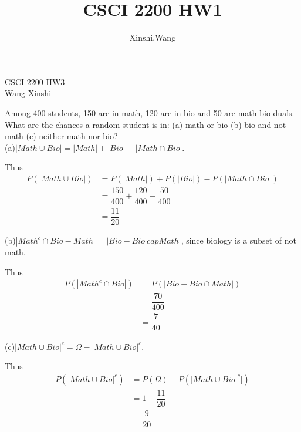 \documentclass{article}
\title{CSCI 2200 HW1}
\author{Xinshi,Wang}
\begin{document}
\noindent
CSCI 2200 HW3\\
Wang Xinshi\\

\begin{addmargin}[2em]{2em}
	 Among 400 students, 150 are in math, 120 are in bio and 50 are math-bio duals. What are the chances a random student is in: (a) math or bio (b) bio and not math (c) neither math nor bio?\\
	
	\noindent (a)$\left |Math \cup Bio \right| = \left |Math \right| + \left |Bio \right| - \left |Math \cap Bio \right|$.

	Thus
	\begin{align*}
		P(\left |Math \cup Bio \right|) &= P(\left |Math \right|) + P(\left |Bio \right|) - P(\left |Math \cap Bio \right|)\\
		&= \dfrac{150}{400}+\dfrac{120}{400}-\dfrac{50}{400}\\
		&= \dfrac{11}{20}
	\end{align*} 

	\noindent (b)$\left |Math^c \cap Bio-Math \right| = \left |Bio-Bio \ capMath \right|$, since biology is a subset of not math.
		
	Thus
	\begin{align*}
		P(\left |Math^c \cap Bio \right|) &= P(\left |Bio - Bio \cap Math \right|)\\
		&= \dfrac{70}{400}\\
		&= \dfrac{7}{40}
	\end{align*} 

	\noindent (c)$\left |Math \cup Bio \right|^c = \Omega - \left |Math \cup Bio \right|^c$.
	
	Thus
	\begin{align*}
		P(\left |Math \cup Bio \right|^c) &= P(\Omega) - P(\left |Math \cup Bio \right|^c|)\\
		&= 1 - \dfrac{11}{20}\\
		&= \dfrac{9}{20}
	\end{align*} 
\end{addmargin}

\clearpage
\end{document}
